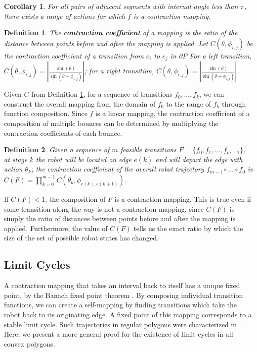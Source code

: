 \documentclass[]{article}
\newtheorem{definition}{Definition}
\newtheorem{corollary}{Corollary}
\begin{document}
\begin{corollary} \label{coro:existcontract}
For all pairs of adjacent 
segments with internal angle less than $\pi$,
there exists a range of actions for which $f$ is a contraction mapping.
\end{corollary}

\begin{definition} \label{def:cc}
The \textbf{contraction coefficient} of a mapping is the ratio of the distance between points before and after
the mapping is applied.
Let $C(\theta, \phi_{i, j})$ be the contraction coefficient of a transition from $e_i$ to $e_j$ in $\partial P$
For a left transition, $C(\theta, \phi_{i, j}) = | \frac{\sin(\theta)}{\sin(\theta - \phi_{i, j})} |$; 
for a right transition,  $C(\theta, \phi_{i, j}) = | \frac{\sin(\theta)}{\sin(\theta + \phi_{i, j})} |$.
\end{definition}

Given $C$ from Definition \ref{def:cc}, for a sequence of transitions $f_0, \ldots, f_k$, 
we can construct the overall mapping from the domain of $f_0$ to the range of $f_k$ through function
composition. Since $f$ is a linear mapping, the contraction coefficient of a composition 
of multiple bounces can be determined by multiplying the contraction
coefficients of each bounce.

\begin{definition} \label{def:c}
Given a sequence of $m$ feasible transitions $F = \{f_0, f_1, \ldots, f_{m-1}\}$, at stage $k$ the robot 
will be located on edge $e(k)$ and will depart the edge with
action $\theta_k$; the contraction coefficient of the overall robot
trajectory $f_{m-1} \circ \ldots \circ f_0$ is $C(F) = \prod_{k=0}^{m-1} C(\theta_{k}, \phi_{e(k), e(k+1)})$.
\end{definition}

If $C(F) < 1$, the composition of $F$ is a contraction mapping. This is true even if some transition along
the way is not a
contraction mapping, since $C(F)$ is simply the ratio of distances
between points before and after the mapping is applied. Furthermore, the value
of $C(F)$ tells us the exact ratio by which the
size of the set of possible robot states has changed.

\subsection{Limit Cycles}
A contraction mapping that takes an interval back
to itself has a unique fixed point, by the Banach fixed point
theorem \cite{Granas2003}. By composing individual transition functions, 
we can create a self-mapping 
by finding transitions which take the robot back to its originating edge. A fixed
point of this mapping corresponds to a stable limit cycle.
Such trajectories in regular polygons were characterized in \cite{NilBecLav17}.
Here, we present a more general proof for the existence of limit cycles in all
convex polygons.
\end{document}
